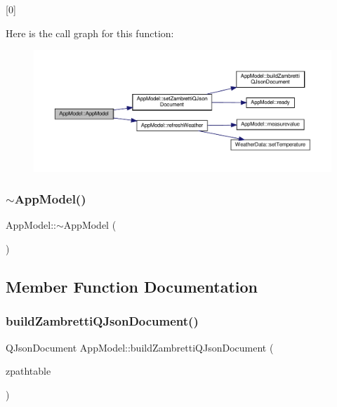 \mbox{[}0\mbox{]} 

Here is the call graph for this function\+:\nopagebreak
\begin{figure}[H]
\begin{center}
\leavevmode
\includegraphics[width=350pt]{class_app_model_a14293f7293e1bcbfdb5499789f9e134b_cgraph}
\end{center}
\end{figure}
\mbox{\label{class_app_model_a67ab3004ccbe2822a8a0abb9fa96ace3}} 
\subsubsection{\texorpdfstring{$\sim$\+App\+Model()}{~AppModel()}}
{\footnotesize\ttfamily App\+Model\+::$\sim$\+App\+Model (\begin{DoxyParamCaption}{ }\end{DoxyParamCaption})}



\subsection{Member Function Documentation}
\mbox{\label{class_app_model_a2e738230cd01012b529adadc3f7c4eae}} 
\subsubsection{\texorpdfstring{build\+Zambretti\+Q\+Json\+Document()}{buildZambrettiQJsonDocument()}}
{\footnotesize\ttfamily Q\+Json\+Document App\+Model\+::build\+Zambretti\+Q\+Json\+Document (\begin{DoxyParamCaption}\item[{Q\+String}]{zpathtable }\end{DoxyParamCaption})}

